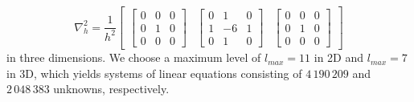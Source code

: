 \begin{equation*}
\nabla^2_h = 
\frac{1}{h^2} \begin{bmatrix}
	\begin{bmatrix}
	0 & 0 & 0 \\
	0 & 1 & 0 \\
	0 & 0 & 0
	\end{bmatrix}
	&		
	\begin{bmatrix}
	0 & 1 & 0 \\
	1 & -6 & 1 \\
	0 & 1 & 0 
	\end{bmatrix} &
	\begin{bmatrix}
	0 & 0 & 0 \\
	0 & 1 & 0 \\
	0 & 0 & 0
\end{bmatrix}
\end{bmatrix}
\end{equation*} in three dimensions.
We choose a maximum level of $l_{max} = 11$ in 2D and $l_{max} = 7$ in 3D, which yields systems of linear equations consisting of $4\,190\,209$ and $2\,048\,383$ unknowns, respectively.

